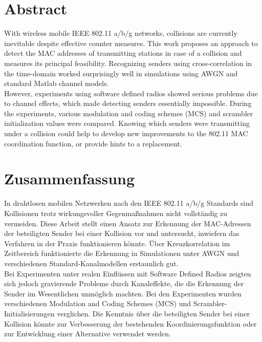 

\begingroup
\let\clearpage\relax
\let\cleardoublepage\relax
\let\cleardoublepage\relax

\chapter*{Abstract}

With wireless mobile IEEE 802.11 a/b/g networks, collisions are currently inevitable despite effective counter measures. This work proposes an approach to detect the MAC addresses of transmitting stations in case of a collision and measures its principal feasibility. Recognizing senders using cross-correlation in the time-domain worked surprisingly well in simulations using AWGN and standard Matlab channel models.\\

However, experiments using software defined radios showed serious problems due to channel effects, which made detecting senders essentially impossible. During the experiments, various modulation and coding schemes (MCS) and scrambler initialization values were compared. Knowing which senders were transmitting under a collision could help to develop new improvements to the 802.11 MAC coordination function, or provide hints to a replacement.



\vfill
{}
\chapter*{Zusammenfassung}

In drahtlosen mobilen Netzwerken nach den IEEE 802.11 a/b/g Standards sind Kollisionen trotz wirkungsvoller Gegenmaßnahmen nicht vollständig zu vermeiden. Diese Arbeit stellt einen Ansatz zur Erkennung der MAC-Adressen der beteiligten Sender bei einer Kollision vor und untersucht, inwiefern das Verfahren in der Praxis funktionieren könnte. Über Kreuzkorrelation im Zeitbereich funktionierte die Erkennung in Simulationen unter AWGN und verschiedenen Standard-Kanalmodellen erstaunlich gut.\\

\noindent Bei Experimenten unter realen Einflüssen mit Software Defined Radios zeigten sich jedoch gravierende Probleme durch Kanaleffekte, die die Erkennung der Sender im Wesentlichen unmöglich machten. Bei den Experimenten wurden verschiedenen Modulation and Coding Schemes (MCS) und Scrambler-Initialisierungen verglichen. Die Kenntnis über die beteiligten Sender bei einer Kollision könnte zur Verbesserung der bestehenden Koordinierungsfunktion oder zur Entwicklung einer Alternative verwendet werden.


\endgroup
\vfill
